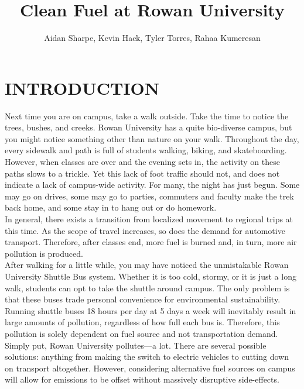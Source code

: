 \documentclass[man]{apa7}
\title{Clean Fuel at Rowan University}
\author{Aidan Sharpe, Kevin Hack, Tyler Torres, Rahaa Kumeresan}
\begin{document}
\maketitle


\section{INTRODUCTION}
	Next time you are on campus, take a walk outside. Take the time to notice the trees, bushes, and creeks. Rowan University has a quite bio-diverse campus, but you might notice something other than nature on your walk. Throughout the day, every sidewalk and path is full of students walking, biking, and skateboarding.
	\\
	However, when classes are over and the evening sets in, the activity on these paths slows to a trickle. Yet this lack of foot traffic should not, and does not indicate a lack of campus-wide activity. For many, the night has just begun. Some may go on drives, some may go to parties, commuters and faculty make the trek back home, and some stay in to hang out or do homework.
	\\
	In general, there exists a transition from localized movement to regional trips at this time. As the scope of travel increases, so does the demand for automotive transport. Therefore, after classes end, more fuel is burned and, in turn, more air pollution is produced.
	\\
	After walking for a little while, you may have noticed the unmistakable Rowan University Shuttle Bus system. Whether it is too cold, stormy, or it is just a long walk, students can opt to take the shuttle around campus. The only problem is that these buses trade personal convenience for environmental sustainability. Running shuttle buses 18 hours per day at 5 days a week will inevitably result in large amounts of pollution, regardless of how full each bus is. Therefore, this pollution is solely dependent on fuel source and not transportation demand.
	\\
	Simply put, Rowan University pollutes---a lot. There are several possible solutions: anything from making the switch to electric vehicles to cutting down on transport altogether. However, considering alternative fuel sources on campus will allow for emissions to be offset without massively disruptive side-effects.
\end{document}

